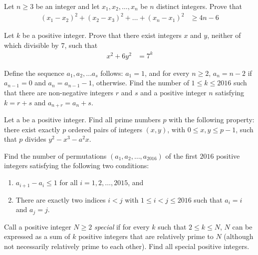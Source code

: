 \documentclass[problems.tex]{subfile}
\begin{document}
	\begin{problem}
		Let $n \geq 3$ be an integer and let $x_1, x_2,\dots , x_n$ be $n$ distinct integers. Prove that
			\begin{align*}
				(x_1 - x_2)^2 +(x_2 - x_3)^2 + \dots+(x_n - x_1)^2
					& \geq 4n - 6
			\end{align*}
	\end{problem}

	\begin{problem}
		Let $k$ be a positive integer. Prove that there exist integers $x$ and $y$, neither of which divisible by $7$, such that
			\begin{align*}
				x^2 + 6y^2
					& = 7^k
			\end{align*}
	\end{problem}

	\begin{problem}
		Define the sequence $a_1, a_2,\dots a_s$ follows: $a_1 = 1$, and for every $n \geq 2$, $a_n = n - 2$ if $a_{n-1} = 0$ and $a_n = a_{n-1} - 1$, otherwise. Find the number of $1 \leq k \leq 2016$ such that there are non-negative integers $r$ and $s$ and a positive integer $n$ satisfying $k = r + s$ and $a_{n+r} = a_n + s.$
	\end{problem}

	\begin{problem}
		Let a be a positive integer. Find all prime numbers $p$ with the following property: there exist exactly $p$ ordered pairs of integers $(x, y)$, with $0 \leq x, y \leq p - 1$, such that $p$ divides $y^2 - x^3 - a^2x$.
	\end{problem}

	\begin{problem}
		Find the number of permutations $(a_1, a_2, \dots, a_{2016})$ of the first $2016$ positive integers satisfying the following two conditions:
		\begin{enumerate}
			\item $a_{i+1} - a_i \leq 1$ for all $i =1 , 2, \dots, 2015$, and
			\item There are exactly two indices $i < j$ with $1 \leq i < j \leq 2016$ such that $a_i = i$ and $a_j = j$.
		\end{enumerate}
	\end{problem}

	\begin{problem}
		Call a positive integer $N \geq 2$ \textit{special} if for every $k$ such that $2 \leq k \leq N$, $N$ can be expressed as a sum of $k$ positive integers that are relatively prime to $N$ (although not necessarily relatively prime to each other). Find all special positive integers.
	\end{problem}
\end{document}
